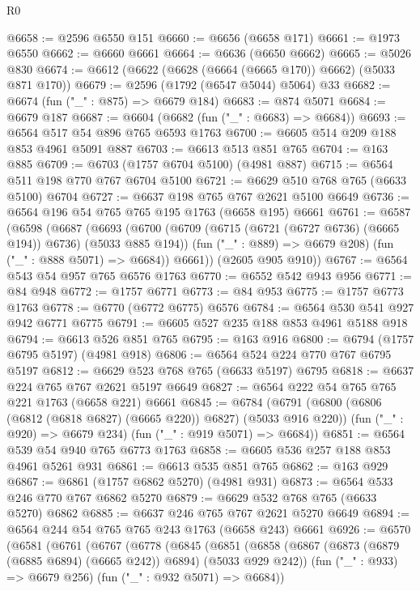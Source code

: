 \begin{lexlean}{R0}
\begin{coremodule}
@6658 := @2596 @6550 @151
@6660 := @6656 (@6658 @171)
@6661 := @1973 @6550
@6662 := @6660 @6661
@6664 := @6636 (@6650 @6662)
@6665 := @5026 @830
@6674 := @6612 (@6622 (@6628 (@6664 (@6665 @170)) @6662) (@5033 @871 @170))
@6679 := @2596 (@1792 (@6547 @5044) @5064) @33
@6682 := @6674 (fun ("_" : @875) => @6679 @184)
@6683 := @874 @5071
@6684 := @6679 @187
@6687 := @6604 (@6682 (fun ("_" : @6683) => @6684))
@6693 := @6564 @517 @54 @896 @765 @6593 @1763
@6700 := @6605 @514 @209 @188 @853 @4961 @5091 @887
@6703 := @6613 @513 @851 @765
@6704 := @163 @885
@6709 := @6703 (@1757 @6704 @5100) (@4981 @887)
@6715 := @6564 @511 @198 @770 @767 @6704 @5100
@6721 := @6629 @510 @768 @765 (@6633 @5100) @6704
@6727 := @6637 @198 @765 @767 @2621 @5100 @6649
@6736 := @6564 @196 @54 @765 @765 @195 @1763 (@6658 @195) @6661
@6761 := @6587
    (@6598
      (@6687
        (@6693
          (@6700
            (@6709 (@6715 (@6721 (@6727 @6736) (@6665 @194)) @6736) (@5033 @885 @194))
            (fun ("_" : @889) => @6679 @208)
            (fun ("_" : @888 @5071) => @6684))
          @6661))
      (@2605 @905 @910))
@6767 := @6564 @543 @54 @957 @765 @6576 @1763
@6770 := @6552 @542 @943 @956
@6771 := @84 @948
@6772 := @1757 @6771
@6773 := @84 @953
@6775 := @1757 @6773 @1763
@6778 := @6770 (@6772 @6775) @6576
@6784 := @6564 @530 @541 @927 @942 @6771 @6775
@6791 := @6605 @527 @235 @188 @853 @4961 @5188 @918
@6794 := @6613 @526 @851 @765
@6795 := @163 @916
@6800 := @6794 (@1757 @6795 @5197) (@4981 @918)
@6806 := @6564 @524 @224 @770 @767 @6795 @5197
@6812 := @6629 @523 @768 @765 (@6633 @5197) @6795
@6818 := @6637 @224 @765 @767 @2621 @5197 @6649
@6827 := @6564 @222 @54 @765 @765 @221 @1763 (@6658 @221) @6661
@6845 := @6784
    (@6791
      (@6800 (@6806 (@6812 (@6818 @6827) (@6665 @220)) @6827) (@5033 @916 @220))
      (fun ("_" : @920) => @6679 @234)
      (fun ("_" : @919 @5071) => @6684))
@6851 := @6564 @539 @54 @940 @765 @6773 @1763
@6858 := @6605 @536 @257 @188 @853 @4961 @5261 @931
@6861 := @6613 @535 @851 @765
@6862 := @163 @929
@6867 := @6861 (@1757 @6862 @5270) (@4981 @931)
@6873 := @6564 @533 @246 @770 @767 @6862 @5270
@6879 := @6629 @532 @768 @765 (@6633 @5270) @6862
@6885 := @6637 @246 @765 @767 @2621 @5270 @6649
@6894 := @6564 @244 @54 @765 @765 @243 @1763 (@6658 @243) @6661
@6926 := @6570
    (@6581
      (@6761
        (@6767
          (@6778
            (@6845
              (@6851
                (@6858
                  (@6867 (@6873 (@6879 (@6885 @6894) (@6665 @242)) @6894) (@5033 @929 @242))
                  (fun ("_" : @933) => @6679 @256)
                  (fun ("_" : @932 @5071) => @6684))

\end{coremodule}
\end{lexlean}
